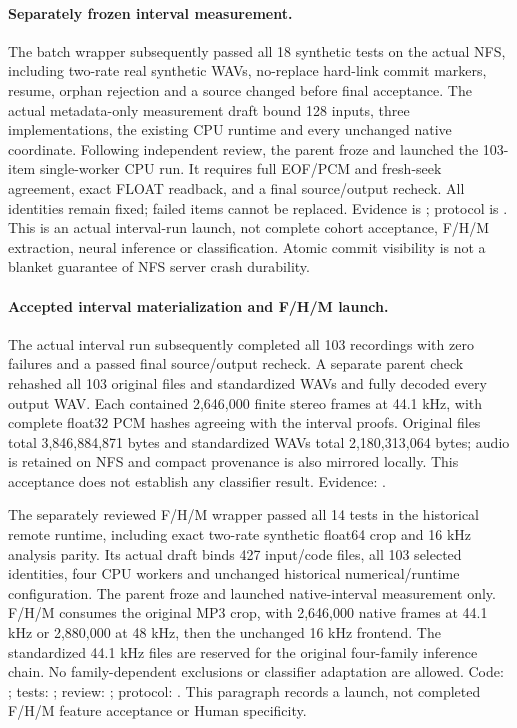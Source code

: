 \paragraph{Separately frozen interval measurement.}
The batch wrapper  subsequently
passed all 18 synthetic tests on the actual NFS, including two-rate real
synthetic WAVs, no-replace hard-link commit markers, resume, orphan rejection
and a source changed before final acceptance. The actual metadata-only
measurement draft bound 128 inputs, three implementations, the existing CPU
runtime and every unchanged native coordinate. Following independent review,
the parent froze 
and launched the 103-item single-worker CPU run. It requires full EOF/PCM and
fresh-seek agreement, exact FLOAT readback, and a final source/output recheck.
All identities remain fixed; failed items cannot be replaced. Evidence is
; protocol is
. This is an actual interval-run
launch, not complete cohort acceptance, F/H/M extraction, neural inference or
classification. Atomic commit visibility is not a blanket guarantee of NFS
server crash durability.

\paragraph{Accepted interval materialization and F/H/M launch.}
The actual interval run subsequently completed all 103 recordings with zero
failures and a passed final source/output recheck. A separate parent check
rehashed all 103 original files and standardized WAVs and fully decoded every
output WAV. Each contained 2,646,000 finite stereo frames at 44.1 kHz, with
complete float32 PCM hashes agreeing with the interval proofs. Original files
total 3,846,884,871 bytes and standardized WAVs total 2,180,313,064 bytes; audio
is retained on NFS and compact provenance is also mirrored locally. This
acceptance does not establish any classifier result. Evidence:
.

The separately reviewed F/H/M wrapper passed all 14 tests in the historical
remote runtime, including exact two-rate synthetic float64 crop and 16 kHz
analysis parity. Its actual draft binds 427 input/code files, all 103 selected
identities, four CPU workers and unchanged historical numerical/runtime
configuration. The parent froze
 and launched
native-interval measurement only. F/H/M consumes the original MP3 crop, with
2,646,000 native frames at 44.1 kHz or 2,880,000 at 48 kHz, then the unchanged
16 kHz frontend. The standardized 44.1 kHz files are reserved for the original
four-family inference chain. No family-dependent exclusions or classifier
adaptation are allowed. Code: ; tests:
; review:
; protocol:
. This paragraph records a launch, not
completed F/H/M feature acceptance or Human specificity.

